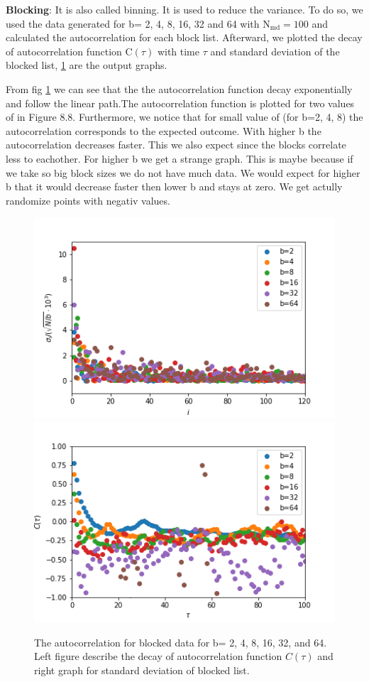 \documentclass[11pt, a4paper, DIV=12]{scrartcl}
\begin{document}
\textbf{Blocking}: It is also called binning. It is used to reduce the variance.
To do so, we used the data generated for b= 2, 4, 8, 16, 32 and 64 with $ \text{N}_{\text{md}}=100 $ and calculated the autocorrelation for each block list. Afterward, we plotted the decay of autocorrelation function C$ (\tau) $ with time $ \tau $ and standard deviation of the blocked list, \ref{fig:blockingAutocorrelation} are the output graphs.
	
From fig \ref{fig:blockingAutocorrelation} we can see that the the autocorrelation function decay exponentially and follow the linear path.The autocorrelation function is plotted for two values of  in Figure 8.8. Furthermore, we notice that for small value of (for b=2, 4, 8) the autocorrelation corresponds to the expected outcome. With higher b the autocorrelation decreases faster. This we also expect since the blocks correlate less to eachother. For higher b we get a strange graph. This is maybe because if we take so big block sizes we do not have much data. We would expect for higher b that it would decrease faster then lower b and stays at zero. We get actully randomize points with negativ values.
	
	\begin{figure}[H]
		\centering
		\includegraphics[width=0.6\linewidth]{blocking_standard_deviation.png}\includegraphics[width=0.6\linewidth]{blocking_autokorrelation.png}
		\caption{ The autocorrelation for blocked data for b= 2, 4, 8, 16, 32, and 64. Left figure describe the decay of autocorrelation function $ C(\tau) $ and right graph for standard deviation of blocked list.}
		\label{fig:blockingAutocorrelation}
	\end{figure}
	
\end{document}
